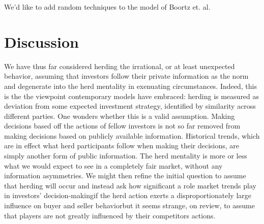 \documentclass{article}
\begin{document}
We'd like to add random techniques to the model of Boortz et. al.



\section{Discussion}
We have thus far considered herding the irrational, or at least unexpected behavior, assuming that investors follow their private information as the norm and degenerate into the herd mentality in exenuating circumstances.
Indeed, this is the the viewpoint contemporary models have embraced: herding is measured as deviation from some expected investment strategy, identified by similarity across different parties. 
One wonders whether this is a valid assumption. 
Making decisions based off the actions of fellow investors is not so far removed from making decisions based on publicly available information.
Historical trends, which are in effect what herd participants follow when making their decisions, are simply another form of public information. 
The herd mentality is more or less what we would expect to see in a completely fair market, without any information asymmetries. 
We might then refine the initial question to assume that herding will occur and instead ask how significant a role market trends play in investors' decision-making\textemdash if the herd action exerts a disproportionately large influence on buyer and seller behavior\textemdash but it seems strange, on review, to assume that players are not greatly influenced by their competitors actions.
\end{document}
